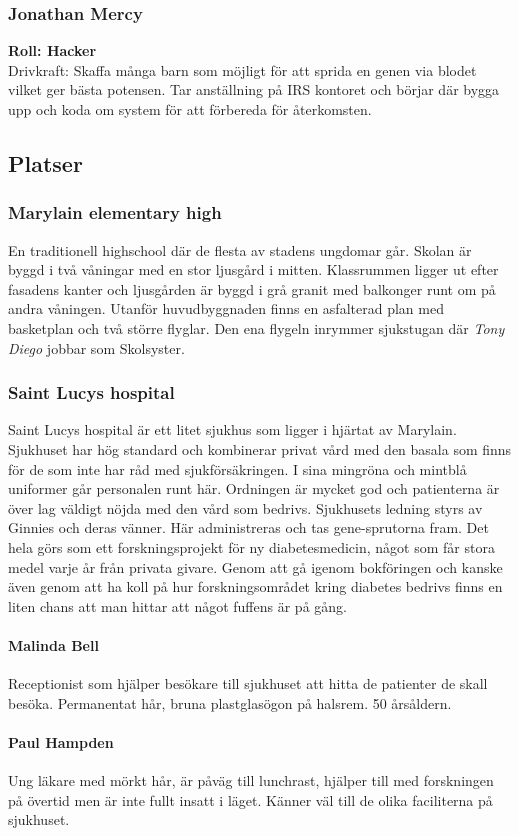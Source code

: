 \documentclass[a5paper,10pt]{report}
\begin{document}
\subsubsection{Jonathan Mercy}
\textbf{Roll: Hacker}\\
Drivkraft: Skaffa många barn som möjligt för att sprida en genen via blodet vilket ger bästa potensen. Tar anställning på IRS kontoret och börjar där bygga upp och koda om system för att förbereda för återkomsten.
\subsection{Platser}
\subsubsection{Marylain elementary high}
En traditionell highschool där de flesta av stadens ungdomar går. Skolan är byggd i två våningar med en stor ljusgård i mitten. Klassrummen ligger ut efter fasadens kanter och ljusgården är byggd i grå granit med balkonger runt om på andra våningen. Utanför huvudbyggnaden finns en asfalterad plan med basketplan och två större flyglar. Den ena flygeln inrymmer sjukstugan där \textit{Tony Diego} jobbar som Skolsyster.
\subsubsection{Saint Lucys hospital}
Saint Lucys hospital är ett litet sjukhus som ligger i hjärtat av Marylain. Sjukhuset har hög standard och kombinerar privat vård med den basala som finns för de som inte har råd med sjukförsäkringen. I sina mingröna och mintblå uniformer går personalen runt här. Ordningen är mycket god och patienterna är över lag väldigt nöjda med den vård som bedrivs. Sjukhusets ledning styrs av Ginnies och deras vänner. Här administreras och tas gene-sprutorna fram. Det hela görs som ett forskningsprojekt för ny diabetesmedicin, något som får stora medel varje år från privata givare. Genom att gå igenom bokföringen och kanske även genom att ha koll på hur forskningsområdet kring diabetes bedrivs finns en liten chans att man hittar att något fuffens är på gång.
\paragraph{Malinda Bell}
Receptionist som hjälper besökare till sjukhuset att hitta de patienter de skall besöka. Permanentat hår, bruna plastglasögon på halsrem. 50 årsåldern.
\paragraph{Paul Hampden}
Ung läkare med mörkt hår, är påväg till lunchrast, hjälper till med forskningen på övertid men är inte fullt insatt i läget. Känner väl till de olika faciliterna på sjukhuset.
\end{document}
